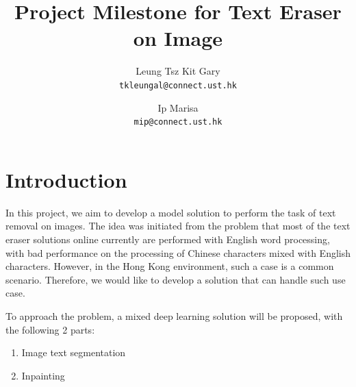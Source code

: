 \documentclass[10pt,twocolumn,letterpaper]{article}
\begin{document}
\title{Project Milestone for Text Eraser on Image}

\author{
Leung Tsz Kit Gary\\
{\tt\small tkleungal@connect.ust.hk}
\and
Ip Marisa\\
{\tt\small mip@connect.ust.hk}
}
\maketitle


\section{Introduction}
\label{sec:intro}

In this project, we aim to develop a model solution to perform the task of text removal on images. 
The idea was initiated from the problem that most of the text eraser solutions online currently are performed with English word processing, 
with bad performance on the processing of Chinese characters mixed with English characters. 
However, in the Hong Kong environment, such a case is a common scenario. Therefore, we would like to develop a solution that can handle such use case.

To approach the problem, a mixed deep learning solution will be proposed, with the following 2 parts:

\begin{enumerate}
  \item Image text segmentation
  \item Inpainting
\end{enumerate}
\end{document}
